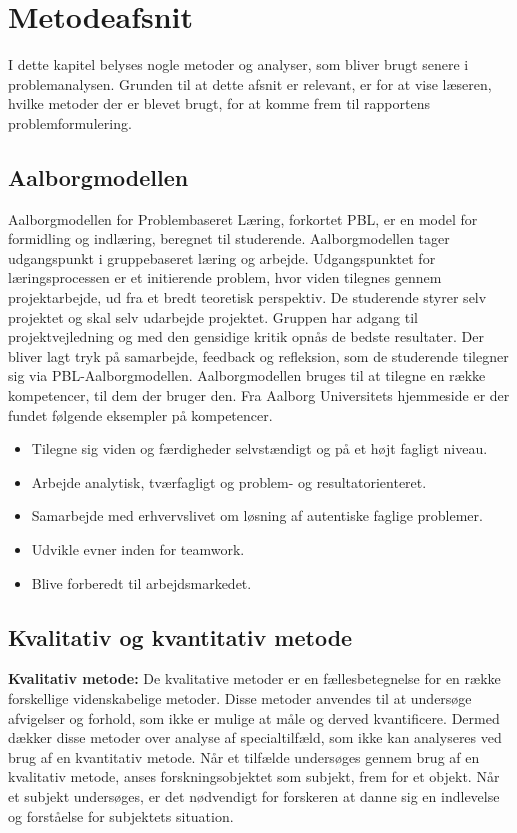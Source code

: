 \chapter{Metodeafsnit}
I dette kapitel belyses nogle metoder og analyser, som bliver brugt senere i problemanalysen. Grunden til at dette afsnit er relevant, er for at vise læseren, hvilke metoder der er blevet brugt, for at komme frem til rapportens problemformulering.

\section{Aalborgmodellen}
Aalborgmodellen for Problembaseret Læring, forkortet PBL, er en model for formidling og indlæring, beregnet til studerende. Aalborgmodellen tager udgangspunkt i gruppebaseret læring og arbejde. Udgangspunktet for læringsprocessen er et initierende problem, hvor viden tilegnes gennem projektarbejde, ud fra et bredt teoretisk perspektiv. De studerende styrer selv projektet og skal selv udarbejde projektet. Gruppen har adgang til projektvejledning og med den gensidige kritik opnås de bedste resultater. Der bliver lagt tryk på samarbejde, feedback og refleksion, som de studerende tilegner sig via PBL-Aalborgmodellen.
Aalborgmodellen bruges til at tilegne en række kompetencer, til dem der bruger den. Fra Aalborg Universitets hjemmeside er der fundet følgende eksempler på kompetencer. \citep{Universitet2015, Universitet2011}
\begin{itemize}
\setlength\itemsep{0.5em}
\item {Tilegne sig viden og færdigheder selvstændigt og på et højt fagligt niveau.}
\item {Arbejde analytisk, tværfagligt og problem- og resultatorienteret.}
\item {Samarbejde med erhvervslivet om løsning af autentiske faglige problemer.}
\item {Udvikle evner inden for teamwork.}
\item {Blive forberedt til arbejdsmarkedet.}
\end{itemize}

\section{Kvalitativ og kvantitativ metode}
\textbf{Kvalitativ metode:}
De kvalitative metoder er en fællesbetegnelse for en række forskellige videnskabelige metoder. Disse metoder anvendes til at undersøge afvigelser og forhold, som ikke er mulige at måle og derved kvantificere. Dermed dækker disse metoder over analyse af specialtilfæld, som ikke kan analyseres ved brug af en kvantitativ metode. Når et tilfælde undersøges gennem brug af en kvalitativ metode, anses forskningsobjektet som subjekt, frem for et objekt. Når et subjekt undersøges, er det nødvendigt for forskeren at danne sig en indlevelse og forståelse for subjektets situation. \citep{Kval, Gymportalen}\\


